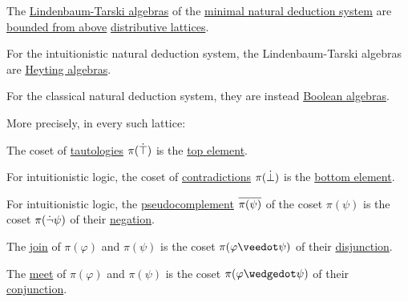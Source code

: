 \begin{proposition}\label{thm:lindenbaum_tarski_algebras}
  The \hyperref[def:lindenbaum_tarski_algebra]{Lindenbaum-Tarski algebras} of the \hyperref[def:propositional_natural_deduction_systems]{minimal natural deduction system} are \hyperref[def:extremal_points/bounds]{bounded from above} \hyperref[def:distributive_lattice]{distributive lattices}.

  \begin{thmenum}[series=thm:lindenbaum_tarski_algebras]
     For the intuitionistic natural deduction system, the Lindenbaum-Tarski algebras are \hyperref[def:heyting_algebra]{Heyting algebras}.

     For the classical natural deduction system, they are instead \hyperref[def:boolean_algebra]{Boolean algebras}.
  \end{thmenum}

  More precisely, in every such lattice:
  \begin{thmenum}[resume=thm:lindenbaum_tarski_algebras]
     The coset of \hyperref[def:propositional_tautology]{tautologies} \( \pi(\dot{\top}) \) is the \hyperref[def:extremal_points/top_and_bottom]{top element}.

     For intuitionistic logic, the coset of \hyperref[def:propositional_contradiction]{contradictions} \( \pi(\dot{\bot}) \) is the \hyperref[def:extremal_points/top_and_bottom]{bottom element}.

     For intuitionistic logic, the \hyperref[eq:def:heyting_algebra/pseudocomplement]{pseudocomplement} \( \oline{\pi(\psi)} \) of the coset \( \pi(\psi) \) is the coset \( \pi(\dot{\neg} \psi) \) of their \hyperref[def:propositional_alphabet/negation]{negation}.

     The \hyperref[def:lattice/join]{join} of \( \pi(\varphi) \) and \( \pi(\psi) \) is the coset \( \pi(\varphi \synvee \psi) \) of their \hyperref[def:propositional_alphabet/connectives/disjunction]{disjunction}.

     The \hyperref[def:lattice/meet]{meet} of \( \pi(\varphi) \) and \( \pi(\psi) \) is the coset \( \pi(\varphi \synwedge \psi) \) of their \hyperref[def:propositional_alphabet/connectives/conjunction]{conjunction}.


\end{thmenum}
\end{proposition}
